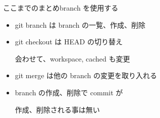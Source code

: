 % 
% 
% 
% 

\begin{frame}[t]{ここまでのまとめ}{branch を使用する}

  \begin{itemize}
  \item git branch は branch の一覧、作成、削除
    \vspace{2ex}

  \item git checkout は HEAD の切り替え

    会わせて、workspace, cached も変更
    \vspace{2ex}

  \item git merge は他の branch の変更を取り入れる
    \vspace{2ex}

  \item branch の作成、削除で commit が

    作成、削除される事は無い
  \end{itemize}

\end{frame}
